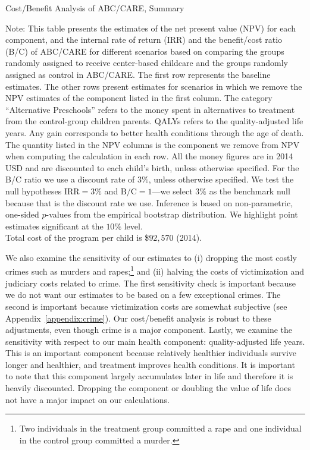 \begin{table}[H]
\centering
\caption{Cost/Benefit Analysis of ABC/CARE, Summary}\label{table:cba}
\begin{threeparttable}
\tiny

\begin{tablenotes}
\footnotesize
\item Note: This table presents the estimates of the net present value (NPV) for each component, and the internal rate of return (IRR) and the benefit/cost ratio (B/C) of ABC/CARE for different scenarios based on comparing the groups randomly assigned to receive center-based childcare and the groups randomly assigned as control in ABC/CARE. The first row represents the baseline estimates. The other rows present estimates for scenarios in which we remove the NPV estimates of the component listed in the first column. The category ``Alternative Preschools'' refers to the money spent in alternatives to treatment from the control-group children parents. QALYs refers to the quality-adjusted life years. Any gain corresponds to better health conditions through the age of death. The quantity listed in the NPV columns is the component we remove from NPV when computing the calculation in each row. All the money figures are in 2014 USD and are discounted to each child's birth, unless otherwise specified. For the B/C ratio we use a discount rate of $3\%$, unless otherwise specified. We test the null hypotheses $\text{IRR} = 3\%$ and $\text{B/C} = 1$---we select $3\%$ as the benchmark null because that is the discount rate we use. Inference is based on non-parametric, one-sided $p$-values from the empirical bootstrap distribution. We highlight point estimates significant at the $10\%$ level.\\
    Total cost of the program per child is \$$92,570$ (2014).
\end{tablenotes}
\end{threeparttable}
\end{table}

We also examine the sensitivity of our estimates to (i) dropping the most costly crimes such as murders and rapes;\footnote{Two individuals in the treatment group committed a rape and one individual in the control group committed a murder.} and (ii) halving the costs of victimization and judiciary costs related to crime. The first sensitivity check is important because we do not want our estimates to be based on a few exceptional crimes. The second is important because victimization costs are somewhat subjective (see  Appendix~\ref{appendix:crime}). Our cost/benefit analysis is robust to these adjustments, even though crime is a major component. Lastly, we examine the sensitivity with respect to our main health component: quality-adjusted life years. This is an important component because relatively healthier individuals survive longer and healthier, and treatment improves health conditions. It is important to note that this component largely accumulates later in life and therefore it is heavily discounted. Dropping the component or doubling the value of life does not have a major impact on our calculations.

